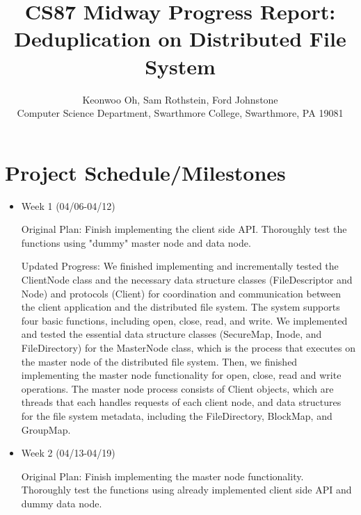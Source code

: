\documentclass[11pt]{article}
\begin{document}
\title{CS87 Midway Progress Report: Deduplication on Distributed File System}

\author{Keonwoo Oh, Sam Rothstein, Ford Johnstone \\
Computer Science Department, Swarthmore College, Swarthmore, PA  19081}

\maketitle

\section{Project Schedule/Milestones}


\begin{itemize}
\item Week 1 (04/06-04/12)

Original Plan: Finish implementing the client side API. Thoroughly test the functions using "dummy" master node and data node.

Updated Progress: We finished implementing and incrementally tested the ClientNode class and the necessary data structure classes (FileDescriptor and Node) and protocols (Client) for coordination and communication between the client application and the distributed file system. The system supports four basic functions, including open, close, read, and write. We implemented and tested the essential data structure classes (SecureMap, Inode, and FileDirectory) for the MasterNode class, which is the process that executes on the master node of the distributed file system. Then, we finished implementing the master node functionality for open, close, read and write operations. The master node process consists of Client objects, which are threads that each handles requests of each client node, and data structures for the file system metadata, including the FileDirectory, BlockMap, and GroupMap.

\item Week 2 (04/13-04/19)

Original Plan: Finish implementing the master node functionality. Thoroughly test the functions using already implemented client side API and dummy data node.


\end{itemize}
\end{document}
